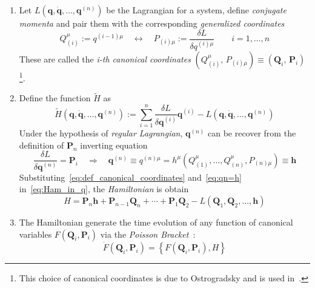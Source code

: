 \begin{enumerate}
  \item Let $L(\bm{q}, \dot{\bm{q}}, \ldots, \bm{q}^{(n)})$ be the Lagrangian
    for a system, define \emph{conjugate momenta} and pair them with the
    corresponding \emph{generalized coordinates}
    \begin{equation} \label{eq:def_canonical_coordinates}
      Q_{(i)}^{\mu} := q^{(i-1)\mu}
      \quad \leftrightarrow \quad
      P_{(i)\mu} := \frac{\delta L}{\delta q^{(i)\mu}}
      \qquad i = 1, \ldots, n
    \end{equation}
    These are called the \emph{i-th canonical coordinates}
    $(Q_{(i)}^{\mu}, \, P_{(i)\mu}) \equiv
    (\bm{Q}_{i}, \, \bm{P}_{i})$\footnote{
      This choice of canonical coordinates is due to Ostrogradsky and is used
      in~\cite{Smilga17, Chen13}.
    }.

  \item Define the function $\tilde{H}$ as
    \begin{equation} \label{eq:Ham_in_q}
      \tilde{H}(\bm{q}, \dot{\bm{q}}, \ldots, \bm{q}^{(n)}) :=
      \sum_{i=1}^{n} \frac{\delta L}{\delta \bm{q}^{(i)}} \bm{q}^{(i)} -
      L(\bm{q}, \dot{\bm{q}}, \ldots, \bm{q}^{(n)})
    \end{equation}
    Under the hypothesis of \emph{regular Lagrangian}, $\bm{q}^{(n)}$ can be
    recover from the definition of $\bm{P}_n$ inverting equation
    \begin{equation} \label{eq:qn=h}
      \frac{\delta L}{\delta \bm{q}^{(n)}} = \bm{P}_i
      \quad \Rightarrow \quad
      \bm{q}^{(n)} \equiv q^{(n)\mu} =
      h^{\mu}(Q^{\mu}_{(1)}, \ldots, Q^{\mu}_{(n)}, P_{(n)\mu}) \equiv \bm{h}
    \end{equation}
    Substituting~\eqref{eq:def_canonical_coordinates} and~\eqref{eq:qn=h}
    in~\eqref{eq:Ham_in_q}, the \emph{Hamiltonian} is obtain
    \begin{equation} \label{eq:general_hamiltonian}
      H = \bm{P}_n \bm{h} + \bm{P}_{n-1} \bm{Q}_n + \cdots + \bm{P}_1 \bm{Q}_2
          - L(\bm{Q}_1, \bm{Q}_2, \ldots, \bm{h})
    \end{equation}

  \item The Hamiltonian generate the time evolution of any function of canonical
    variables $F(\bm{Q}_i, \bm{P}_i)$ via the
    \emph{Poisson Bracket}~\cite{Chen13}:
    \begin{equation} \label{eq:poisson_bracket_evolution}
      \dot{F}(\bm{Q}_i, \bm{P}_i) = \left\{
        F(\bm{Q}_i, \bm{P}_i), H
      \right\}
    \end{equation}


\end{enumerate}
